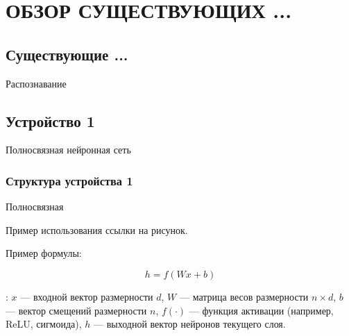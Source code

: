 \chapter[Обзор существующих ...]
{ОБЗОР СУЩЕСТВУЮЩИХ ...}

\section{Существующие ...}\par
\hspace*{12.5 mm}Распознавание 

\section{Устройство 1}\par
\hspace*{12.5 mm}Полносвязная нейронная сеть 

\subsection{Структура устройства 1}\par
\hspace*{12.5 mm}Полносвязная 

Пример использования ссылки на рисунок.

Пример формулы:

\begin{equation}
    {h} = f({W} {x} + {b})
\end{equation}

: ${x}$ — входной вектор размерности $d$,
              ${W}$ — матрица весов размерности $n \times d$,
              ${b}$ — вектор смещений размерности $n$,
              $f(\cdot)$ — функция активации (например, ReLU, сигмоида),
              ${h}$ — выходной вектор нейронов текущего слоя.

